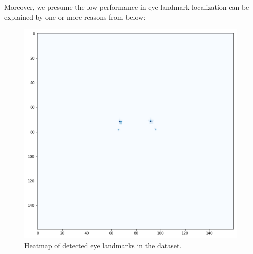 Moreover, we presume the low performance in eye landmark localization can be explained by one or more reasons from below:

\begin{figure}[tb]
\centering
\includegraphics[width=0.6\linewidth]{images/eyes/heatmap_eyes_v0.914.png}
\caption{Heatmap of detected eye landmarks in the \adhoc dataset.}
\label{fig:heatmap_eyes}
\end{figure}

